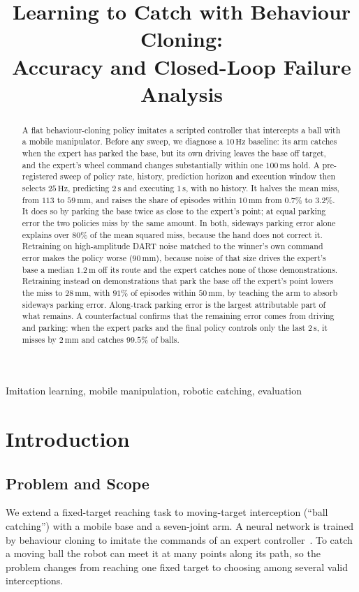 \documentclass[conference]{IEEEtran}
\title{Learning to Catch with Behaviour Cloning:\\
Accuracy and Closed-Loop Failure Analysis}
\author{\IEEEauthorblockN{William Boyd, Nick Wright, Yiyan Wang}
\IEEEauthorblockA{University College London\\London, United Kingdom}}
\begin{document}
\maketitle

\begin{abstract}
A flat behaviour-cloning policy imitates a scripted controller that intercepts a ball with a mobile manipulator. Before any sweep, we diagnose a $10\,\mathrm{Hz}$ baseline: its arm catches when the expert has parked the base, but its own driving leaves the base off target, and the expert's wheel command changes substantially within one $100\,\mathrm{ms}$ hold. A pre-registered sweep of policy rate, history, prediction horizon and execution window then selects $25\,\mathrm{Hz}$, predicting $2\,\mathrm{s}$ and executing $1\,\mathrm{s}$, with no history. It halves the mean miss, from $113$ to $59\,\mathrm{mm}$, and raises the share of episodes within $10\,\mathrm{mm}$ from $0.7\%$ to $3.2\%$. It does so by parking the base twice as close to the expert's point; at equal parking error the two policies miss by the same amount. In both, sideways parking error alone explains over $80\%$ of the mean squared miss, because the hand does not correct it. Retraining on high-amplitude DART noise matched to the winner's own command error makes the policy worse ($90\,\mathrm{mm}$), because noise of that size drives the expert's base a median $1.2\,\mathrm{m}$ off its route and the expert catches none of those demonstrations. Retraining instead on demonstrations that park the base off the expert's point lowers the miss to $28\,\mathrm{mm}$, with $91\%$ of episodes within $50\,\mathrm{mm}$, by teaching the arm to absorb sideways parking error. Along-track parking error is the largest attributable part of what remains. A counterfactual confirms that the remaining error comes from driving and parking: when the expert parks and the final policy controls only the last $2\,\mathrm{s}$, it misses by $2\,\mathrm{mm}$ and catches $99.5\%$ of balls.
\end{abstract}

\begin{IEEEkeywords}
Imitation learning, mobile manipulation, robotic catching, evaluation
\end{IEEEkeywords}

\section{Introduction}
\subsection{Problem and Scope}
We extend a fixed-target reaching task to moving-target interception (``ball catching'') with a mobile base and a seven-joint arm. A neural network is trained by behaviour cloning to imitate the commands of an expert controller~\cite{pomerleau1991}. To catch a moving ball the robot can meet it at many points along its path, so the problem changes from reaching one fixed target to choosing among several valid interceptions.
\end{document}

